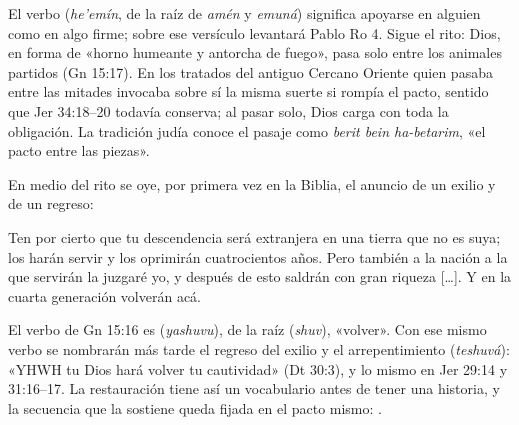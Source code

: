 El verbo  (\emph{he'emín}, de la raíz de \emph{amén} y \emph{emuná}) significa apoyarse en alguien como en algo firme; sobre ese versículo levantará Pablo Ro 4. Sigue el rito: Dios, en forma de «horno humeante y antorcha de fuego», pasa solo entre los animales partidos (Gn 15:17). En los tratados del antiguo Cercano Oriente quien pasaba entre las mitades invocaba sobre sí la misma suerte si rompía el pacto, sentido que Jer 34:18–20 todavía conserva; al pasar solo, Dios carga con toda la obligación. La tradición judía conoce el pasaje como \emph{berit bein ha-betarim}, «el pacto entre las piezas».

En medio del rito se oye, por primera vez en la Biblia, el anuncio de un exilio y de un regreso:

\begin{cita}Ten por cierto que tu descendencia será extranjera en una tierra que no es suya; los harán servir y los oprimirán cuatrocientos años. Pero también a la nación a la que servirán la juzgaré yo, y después de esto saldrán con gran riqueza [\ldots]. Y en la cuarta generación volverán acá.\end{cita}

El verbo de Gn 15:16 es  (\emph{yashuvu}), de la raíz  (\emph{shuv}), «volver». Con ese mismo verbo se nombrarán más tarde el regreso del exilio y el arrepentimiento (\emph{teshuvá}): «YHWH tu Dios hará volver tu cautividad» (Dt 30:3), y lo mismo en Jer 29:14 y 31:16–17. La restauración tiene así un vocabulario antes de tener una historia, y la secuencia que la sostiene queda fijada en el pacto mismo: .

